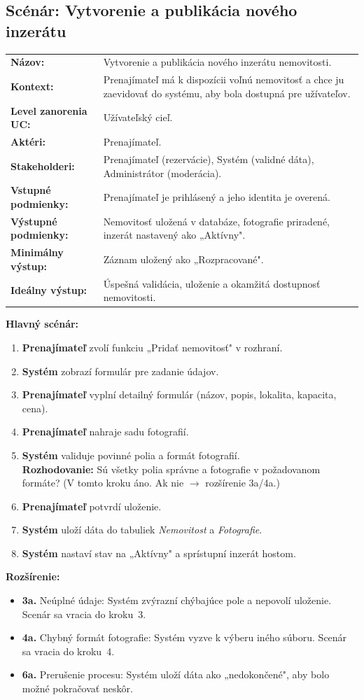 \documentclass[11pt, a4paper]{article}
\makeatletter
\newenvironment{scenparams}{%
  \par\vspace{0.1cm}%
  \noindent{\color{ruleblue}\rule{\textwidth}{0.8pt}}\nopagebreak%
  \vspace{2pt}\par\nopagebreak%
  \begin{tabular}{@{}p{4.7cm}@{\hspace{0.1cm}}p{\dimexpr\textwidth-5.0cm\relax}@{}}%
}{%
  \end{tabular}%
  \par\vspace{-2pt}%
  \noindent{\color{ruleblue}\rule{\textwidth}{0.8pt}}%
  \vspace{0.35cm}%
}
\newcommand{\sprow}[2]{\textbf{#1:} & #2 \\[3pt]}
\makeatother
\begin{document}
\subsection{Scénár: Vytvorenie a publikácia nového inzerátu}

\begin{scenparams}
  \sprow{Názov}{Vytvorenie a publikácia nového inzerátu nemovitosti.}
  \sprow{Kontext}{Prenajímateľ má k dispozícii voľnú nemovitosť a chce ju zaevidovať do systému, aby bola dostupná pre užívateľov.}
  \sprow{Level zanorenia UC}{Užívateľský cieľ.}
  \sprow{Aktéri}{Prenajímateľ.}
  \sprow{Stakeholderi}{Prenajímateľ (rezervácie), Systém (validné dáta), Administrátor (moderácia).}
  \sprow{Vstupné podmienky}{Prenajímateľ je prihlásený a jeho identita je overená.}
  \sprow{Výstupné podmienky}{Nemovitosť uložená v databáze, fotografie priradené, inzerát nastavený ako „Aktívny".}
  \sprow{Minimálny výstup}{Záznam uložený ako „Rozpracované".}
  \sprow{Ideálny výstup}{Úspešná validácia, uloženie a okamžitá dostupnosť nemovitosti.}
\end{scenparams}

\textbf{Hlavný scénár:}
\begin{enumerate}
  \item \textbf{Prenajímateľ} zvolí funkciu „Pridať nemovitosť" v rozhraní.
  \item \textbf{Systém} zobrazí formulár pre zadanie údajov.
  \item \textbf{Prenajímateľ} vyplní detailný formulár (názov, popis, lokalita, kapacita, cena).
  \item \textbf{Prenajímateľ} nahraje sadu fotografií.
  \item \textbf{Systém} validuje povinné polia a formát fotografií.\\
        \textcolor{newblue}{\textbf{Rozhodovanie:} Sú všetky polia správne a fotografie v požadovanom formáte? (V tomto kroku áno. Ak nie $\rightarrow$ rozšírenie 3a/4a.)}
  \item \textbf{Prenajímateľ} potvrdí uloženie.
  \item \textbf{Systém} uloží dáta do tabuliek \textit{Nemovitost} a \textit{Fotografie}.
  \item \textbf{Systém} nastaví stav na „Aktívny" a sprístupní inzerát hostom.
\end{enumerate}

\textbf{Rozšírenie:}
\begin{itemize}
  \item \textbf{3a.} Neúplné údaje: Systém zvýrazní chýbajúce pole a nepovolí uloženie. Scenár sa vracia do kroku~3.
  \item \textbf{4a.} Chybný formát fotografie: Systém vyzve k výberu iného súboru. Scenár sa vracia do kroku~4.
  \item \textbf{6a.} Prerušenie procesu: Systém uloží dáta ako „nedokončené", aby bolo možné pokračovať neskôr.
\end{itemize}
\end{document}
